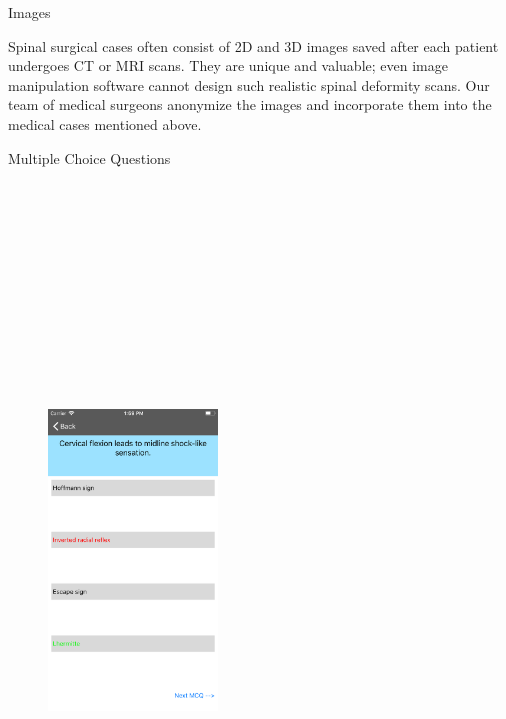 \documentclass[final]{beamer}
\newlength{\onecolwid}
\begin{document}
\begin{frame}[t]
\begin{columns}[t]
\begin{column}{\onecolwid}
\begin{block}{\LARGE Images}
\begin{figure}
\end{figure}
\large
Spinal surgical cases often consist of 2D and 3D images saved after each patient undergoes CT or MRI scans. They are unique and valuable; even image manipulation software cannot design such realistic spinal deformity scans. Our team of medical surgeons anonymize the images and incorporate them into the medical cases mentioned above.
\newline
\end{block}

\begin{block}{\LARGE Multiple Choice Questions}

\begin{figure}
\centering
\includegraphics[width=0.4\textwidth, height=20cm]{mcq.png}


\end{figure}
\end{block}
\end{column}
\end{columns}
\end{frame}
\end{document}
